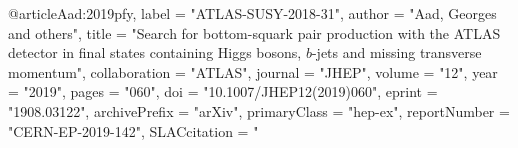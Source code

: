 @article{Aad:2019pfy,
      label          = "ATLAS-SUSY-2018-31",
      author         = "Aad, Georges and others",
      title          = "{Search for bottom-squark pair production with the ATLAS
                        detector in final states containing Higgs bosons, $b$-jets
                        and missing transverse momentum}",
      collaboration  = "ATLAS",
      journal        = "JHEP",
      volume         = "12",
      year           = "2019",
      pages          = "060",
      doi            = "10.1007/JHEP12(2019)060",
      eprint         = "1908.03122",
      archivePrefix  = "arXiv",
      primaryClass   = "hep-ex",
      reportNumber   = "CERN-EP-2019-142",
      SLACcitation   = "%
}

